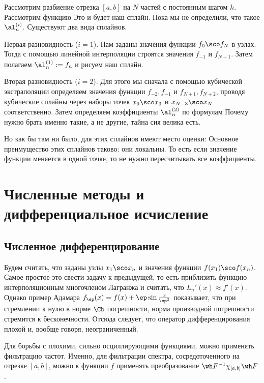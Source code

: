 \documentclass[a4paper]{article}
\begin{document}
Рассмотрим разбиение отрезка $[a,b]$ на $N$ частей с постоянным шагом
$h$.  Рассмотрим функцию  Это и будет наш сплайн. Пока мы
не определили, что такое $\al_n^{(i)}$.  Существуют два вида сплайнов.

Первая разновидность ($i = 1$). Нам заданы значения функции $f_0\sco
f_N$ в узлах.  Тогда с помощью линейной интерполяции строятся значения
$f_{-1}$ и $f_{N+1}$. Затем полагаем $\al_n^{(1)} := f_n$ и рисуем наш
сплайн.

Вторая разновидность ($i=2$). Для этого мы сначала с помощью
кубической экстраполяции определяем значения функции $f_{-2}, f_{-1}$
и $f_{N+1}, f_{N+2}$, проводя кубические сплайны через наборы точек
$x_0\sco x_3$ и $x_{N-3}\sco x_N$ соответственно.  Затем определяем
коэффициенты $\al_n^{(2)}$ по формулам   Почему нужно брать именно такие, а не
другие, тайна сия велика есть.

Но как бы там ни было, для этих сплайнов имеют место оценки: 
 Основное преимущество этих сплайнов таково: они локальны. То есть
если значение функции меняется в одной точке, то не нужно
пересчитывать все коэффициенты.

\section{Численные методы и дифференциальное исчисление}

\subsection{Численное дифференцирование}

Будем считать, что заданы узлы $x_1\sco x_n$ и значения функции
$f(x_1)\sco f(x_n)$.  Самое простое это свести задачу к предыдущей, то
есть приблизить функцию интерполяционным многочленом Лагранжа и
считать, что $L_n'(x) \approx f'(x)$. Однако пример Адамара $f_\ep(x)
= f(x) + \ep\sin\frac{x}{\ep^2}$ показывает, что при стремлении к нулю
в норме $\Cb$ погрешности, норма производной погрешности стремится к
бесконечности. Отсюда следует, что оператор дифференцирования плохой
и, вообще говоря, неограниченный.

Для борьбы с плохими, сильно осциллирующими функциями, можно применять
фильтрацию частот.  Именно, для фильтрации спектра, сосредоточенного
на отрезке $[a,b]$, можно к функции $f$ применять преобразование $\wh
F^{-1} \chi_{[a,b]}\wh F$.
\end{document}
